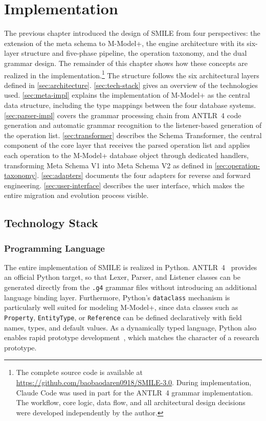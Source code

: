 \chapter{Implementation}\label{ch:implementation}

  The previous chapter introduced the design of SMILE from four perspectives: the extension of the meta schema to M-Model+, the engine architecture with its six-layer
  structure and five-phase pipeline, the operation taxonomy, and the dual grammar design. The remainder of this chapter shows how these concepts are realized in the implementation.\footnote{The complete source code is available at
  \url{https://github.com/baobaodaren0918/SMILE-3.0}. During implementation, Claude Code was used in part for the ANTLR~4 grammar implementation. The workflow, core logic, data flow, and all architectural design decisions were developed independently by the author.} The structure follows the six architectural layers defined in \autoref{sec:architecture}. \autoref{sec:tech-stack} gives an overview of the technologies used.
  \autoref{sec:meta-impl} explains the implementation of M-Model+ as the central data structure, including the type mappings between the four database systems.
  \autoref{sec:parser-impl} covers the grammar processing chain from ANTLR~4 code generation and automatic grammar recognition to the listener-based generation of the
  operation list. \autoref{sec:transformer} describes the Schema Transformer, the central component of the core layer that receives the parsed operation list and applies each operation to the M-Model+ database object through dedicated handlers, transforming Meta Schema V1 into Meta Schema V2 as defined in \autoref{sec:operation-taxonomy}.  \autoref{sec:adapters} documents the four adapters for reverse and forward engineering. \autoref{sec:user-interface} describes the user interface, which makes the entire migration and evolution process visible.

\section{Technology Stack}\label{sec:tech-stack}
\subsection{Programming Language}\label{subsec:lang-python}

  The entire implementation of SMILE  is realized in Python. ANTLR~4~\cite{parr2013definitive} provides an official Python target, so that Lexer, Parser, and Listener
  classes can be generated directly from the \texttt{.g4} grammar files without introducing an additional language binding layer. Furthermore, Python's
  \texttt{dataclass} mechanism is particularly well suited for modeling M-Model+, since data classes such as \texttt{Property}, \texttt{EntityType}, or
  \texttt{Reference} can be defined declaratively with field names, types, and default values. As a dynamically typed language, Python also enables rapid prototype development~\cite{zeller2022academic}, which matches the character of a research prototype.


